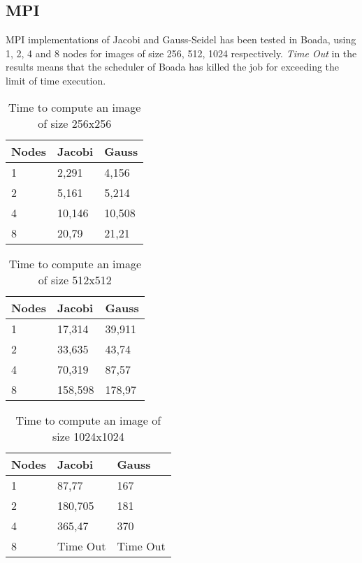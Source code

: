 \documentclass[a4paper, 10pt]{article}
\begin{document}
\clearpage
\subsection{MPI}

MPI implementations of Jacobi and Gauss-Seidel has been tested in Boada, using 1, 2, 4 and 8 nodes for images of size 256, 512, 1024 respectively. \textit{Time Out} in the results means that the scheduler of Boada has killed the job for exceeding the limit of time execution.

\begin{table}[ht]
\centering
\begin{tabular}{l|ll} 
\toprule
Nodes & Jacobi & Gauss   \\ 
\hline
1       & 2,291  & 4,156   \\
2       & 5,161  & 5,214   \\
4       & 10,146 & 10,508  \\
8       & 20,79  & 21,21   \\
\bottomrule
\end{tabular}
\caption{Time to compute an image of size 256x256}

\end{table}

\begin{table}[ht]
\centering
\begin{tabular}{l|ll} 
\toprule
  Nodes & Jacobi  & Gauss   \\ 
\hline
1       & 17,314  & 39,911  \\
2       & 33,635  & 43,74   \\
4       & 70,319  & 87,57   \\
8       & 158,598 & 178,97  \\
\bottomrule
\end{tabular}
\caption{Time to compute an image of size 512x512}
\end{table}

\begin{table}[ht]
\centering
\begin{tabular}{l|ll} 
\toprule
Nodes & Jacobi  & Gauss    \\ 
\hline
1     & 87,77   & 167      \\
2     & 180,705 & 181      \\
4     & 365,47  & 370      \\
  8     & Time Out & Time Out  \\
\bottomrule
\end{tabular}
\caption{Time to compute an image of size 1024x1024}
\end{table}
\end{document}
